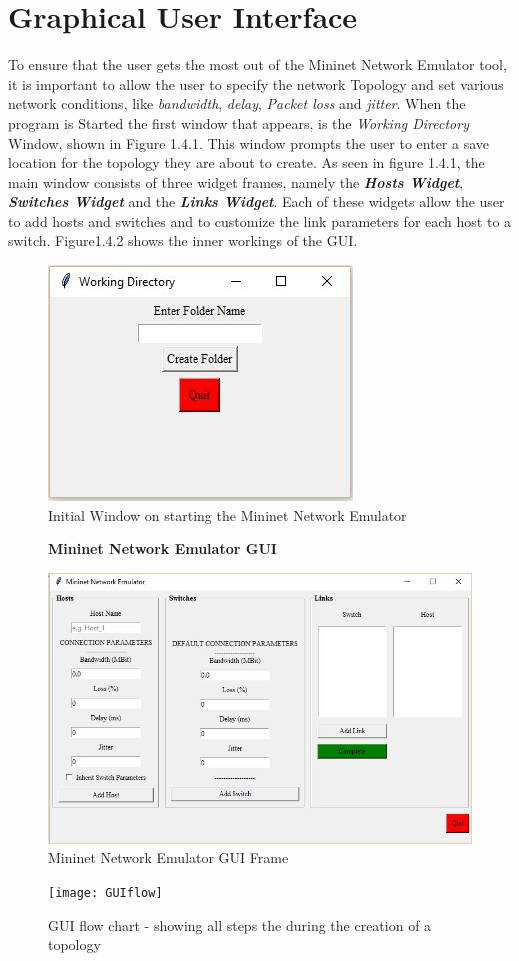 \section{Graphical User Interface}
To ensure that the user gets the most out of the Mininet Network Emulator tool, it is important 
to allow the user to specify the network Topology and set various network conditions, like \textit{bandwidth}, \textit{delay},
\textit{Packet loss} and \textit{jitter}. When the program is Started the first window that appears, is the \textit{Working Directory} Window, shown in Figure 1.4.1. This window prompts the user to enter a save location for the topology they are about to create.  As seen in figure 1.4.1, the main window consists of three widget frames, namely the \textbf{\textit{Hosts Widget}},  \textbf{\textit{Switches Widget}} and the  \textbf{\textit{Links Widget}}. Each of these widgets allow the user to add hosts and switches and to customize the link parameters for each host to a switch. Figure1.4.2 shows the inner workings of the GUI.
\begin{figure}[H]
    \centering
    \includegraphics[scale=0.8]{Directory}
    \caption{Initial Window on starting the Mininet Network Emulator}
\end{figure}
\begin{figure}[H]
    \centering
    \textbf{Mininet Network Emulator GUI}\par\medskip
    \includegraphics[scale=0.5]{Entire_window}
    \caption{Mininet Network Emulator GUI Frame}
\end{figure}
\begin{figure}[H]
    \centering
    \texttt{[image: GUIflow]}
    \caption{GUI flow chart - showing all steps the during the creation of a topology}
\end{figure}

